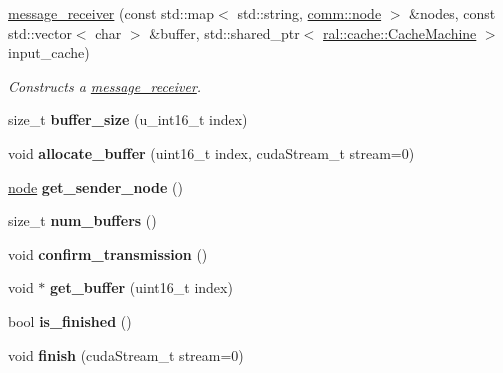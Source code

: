\begin{DoxyCompactItemize}
\item 
\hyperlink{classcomm_1_1message__receiver_ab49d04074a12b8f9ad00dc26b84a43ca}{message\+\_\+receiver} (const std\+::map$<$ std\+::string, \hyperlink{classcomm_1_1node}{comm\+::node} $>$ \&nodes, const std\+::vector$<$ char $>$ \&buffer, std\+::shared\+\_\+ptr$<$ \hyperlink{classral_1_1cache_1_1CacheMachine}{ral\+::cache\+::\+Cache\+Machine} $>$ input\+\_\+cache)
\begin{DoxyCompactList}\small\item\em Constructs a \hyperlink{classcomm_1_1message__receiver}{message\+\_\+receiver}. \end{DoxyCompactList}\item 
\mbox{\label{classcomm_1_1message__receiver_a33eff32bfde13d8f0579089f297559f7}} 
size\+\_\+t {\bfseries buffer\+\_\+size} (u\+\_\+int16\+\_\+t index)
\item 
\mbox{\label{classcomm_1_1message__receiver_ab45c4394a35fb0ca81f091606c0c6f9b}} 
void {\bfseries allocate\+\_\+buffer} (uint16\+\_\+t index, cuda\+Stream\+\_\+t stream=0)
\item 
\mbox{\label{classcomm_1_1message__receiver_a4527d37c56a04d2b6e82a469cbd14683}} 
\hyperlink{classcomm_1_1node}{node} {\bfseries get\+\_\+sender\+\_\+node} ()
\item 
\mbox{\label{classcomm_1_1message__receiver_a4423b1caa4472204e5491f84f1addc65}} 
size\+\_\+t {\bfseries num\+\_\+buffers} ()
\item 
\mbox{\label{classcomm_1_1message__receiver_ab9c3bb7eb1f6b8123bbc8b2b4ef47b77}} 
void {\bfseries confirm\+\_\+transmission} ()
\item 
\mbox{\label{classcomm_1_1message__receiver_aac2ed6c851ace8d403721b31a99f8845}} 
void $\ast$ {\bfseries get\+\_\+buffer} (uint16\+\_\+t index)
\item 
\mbox{\label{classcomm_1_1message__receiver_a6940eb5eae53218e3c07cb1b22fb4ae5}} 
bool {\bfseries is\+\_\+finished} ()
\item 
\mbox{\label{classcomm_1_1message__receiver_a593257af754fdef710dac5e2b408fe40}} 
void {\bfseries finish} (cuda\+Stream\+\_\+t stream=0)
\end{DoxyCompactItemize}


